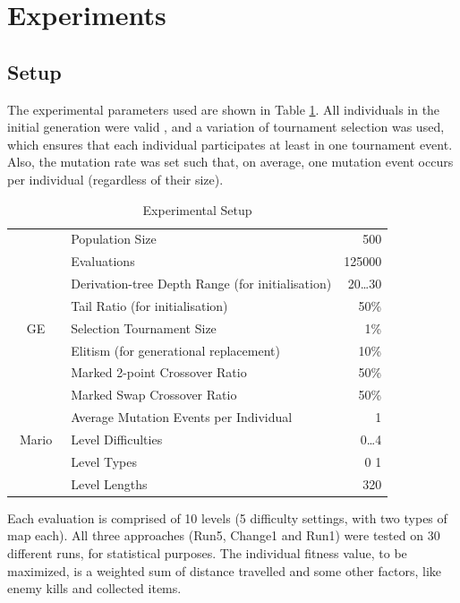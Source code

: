 \documentclass[conference]{IEEEtran}
\begin{document}
\section{Experiments}

\subsection{Setup}

The experimental parameters used are shown in Table \ref{tab:gesetup}. All
individuals in the initial generation were valid \cite{RA03}, and
a variation of tournament selection was used, which ensures that each
individual participates at least in one tournament event. Also, the mutation
rate was set such that, on average, one mutation event occurs per
individual (regardless of their size).

\begin{table}[ht]
	\begin{center}
	\caption{Experimental Setup}
	\label{tab:gesetup}
	\begin{tabular}{|c|l|r|}
		\hline
		&Population Size & 500\\
		&Evaluations     & 125000\\
		&Derivation-tree Depth Range (for initialisation) & 20\ldots30\\
		&Tail Ratio (for initialisation) & 50\%\\
		GE&Selection Tournament Size & 1\%\\
		&Elitism (for generational replacement) & 10\%\\
		&Marked 2-point Crossover Ratio & 50\%\\
		&Marked Swap Crossover Ratio & 50\%\\
		&Average Mutation Events per Individual & 1\\
		\hline
		\ Mario\ &Level Difficulties & 0\ldots4 \\
		&Level Types & 0 1 \\
		&Level Lengths & 320\\
		\hline
	\end{tabular}
	\end{center}
\end{table}

Each evaluation is comprised of 10 levels (5 difficulty settings, with two
types of map each). All three approaches (Run5, Change1 and Run1) were tested on
30 different runs, for statistical purposes. The individual fitness value, to be maximized, 
is a weighted sum of distance travelled and some other factors, like enemy kills and 
collected items.
\end{document}
